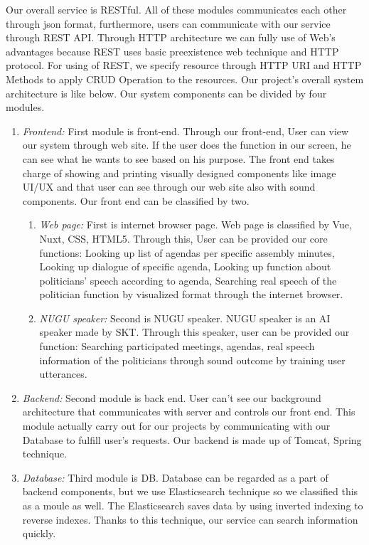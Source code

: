 \documentclass[conference]{IEEEtran}
\begin{document}
Our overall service is RESTful. All of these modules communicates each other through json format, furthermore, users can communicate with our service through REST API. Through HTTP architecture we can fully use of Web’s advantages because REST uses basic preexistence web technique and HTTP protocol. For using of REST, we specify resource through HTTP URI and HTTP Methods to apply CRUD Operation to the resources.
Our project’s overall system architecture is like below. Our system components can be divided by four modules.\\
\begin{enumerate}
\item \textit {Frontend:} First module is front-end. Through our front-end, User can view our system through web site. If the user does the function in our screen, he can see what he wants to see based on his purpose. The front end takes charge of showing and printing visually designed components like image UI/UX and that user can see through our web site also with sound components. Our front end can be classified by two. \\
\begin{enumerate}
    \item\textit{Web page:} First is internet browser page. Web page is classified by Vue, Nuxt, CSS, HTML5. Through this, User can be provided our core functions: Looking up list of agendas per specific assembly minutes, Looking up dialogue of specific agenda, Looking up function about politicians’ speech according to agenda, Searching real speech of the politician function by visualized format through the internet browser.\\
    \item \textit{NUGU speaker:} Second is NUGU speaker. NUGU speaker is an AI speaker made by SKT. Through this speaker, user can be provided our function: Searching participated meetings, agendas, real speech information of the politicians through sound outcome by training user utterances.\\
\end{enumerate}
\item \textit{Backend:} Second module is back end. User can’t see our background architecture that communicates with server and controls our front end. This module actually carry out for our projects by  communicating with our Database to fulfill user’s requests. Our backend is made up of Tomcat, Spring technique.\\
\item \textit{Database:} Third module is DB. Database can be regarded as a part of backend components, but we use Elasticsearch technique so we classified this as a moule as well. The Elasticsearch saves data by using inverted indexing to reverse indexes. Thanks to this technique, our service can search information quickly.\\

\end{enumerate}
\end{document}
